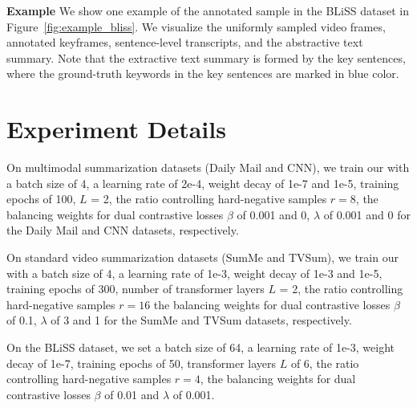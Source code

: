 \vspace{0.05in} 
\noindent\textbf{Example}
We show one example of the annotated sample in the BLiSS dataset in Figure~\ref{fig:example_bliss}. We visualize the uniformly sampled video frames, annotated keyframes, sentence-level transcripts, and the abstractive text summary. Note that the extractive text summary is formed by the key sentences, where the ground-truth keywords in the key sentences are marked in blue color.
\begin{figure*}[t]
\vspace{-0.1in}
\centering
    \vspace{-0.25in}
    \caption{Example of one data sample from the BLiSS dataset. Here, we visualize the uniformly sampled video frames, annotated keyframes, sentence-level transcript, and abstractive text summary. Note that the extractive text summary is formed by the key sentences, where the ground-truth keywords are marked with \textcolor{-red!70!green}{blue} color. Best viewed in color.}
\vspace{-0.15in}
\label{fig:example_bliss}
\end{figure*}



\section{Experiment Details}
\vspace{-0.05in}
\label{sec:experiment_details}
On multimodal summarization datasets (Daily Mail and CNN), we train our \system with a batch size of 4, a learning rate of 2e-4, weight decay of 1e-7 and 1e-5, training epochs of 100,  $L$ = 2, the ratio controlling hard-negative samples $r=8$, the balancing weights for dual contrastive losses $\beta$ of 0.001 and 0, $\lambda$ of 0.001 and 0 for the Daily Mail and CNN datasets, respectively. 

On standard video summarization datasets (SumMe and TVSum), we train our \system with a batch size of 4, a learning rate of 1e-3, weight decay of 1e-3 and 1e-5, training epochs of 300, number of transformer layers $L$ = 2, the ratio controlling hard-negative samples $r=16$ the balancing weights for dual contrastive losses $\beta$ of 0.1, $\lambda$ of 3 and 1 for the SumMe and TVSum datasets, respectively.

On the BLiSS dataset, we set a batch size of 64, a learning rate of 1e-3, weight decay of 1e-7, training epochs of 50, transformer layers $L$ of 6, the ratio controlling hard-negative samples $r=4$, the balancing weights for dual contrastive losses $\beta$ of 0.01 and $\lambda$ of 0.001.

